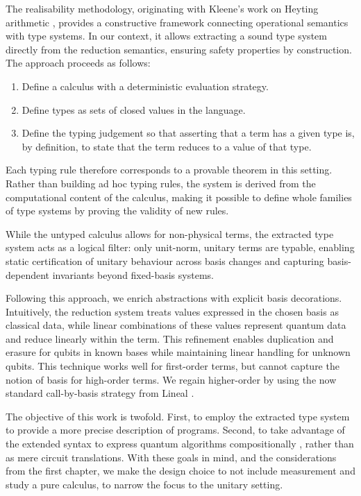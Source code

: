 The realisability methodology, originating with Kleene's work on Heyting
arithmetic \cite{KleeneJSL45}, provides a constructive framework connecting
operational semantics with type systems. In our context, it allows extracting 
a sound type system directly from the reduction semantics, ensuring safety
properties by construction. The approach proceeds as follows:
\begin{enumerate}
  \item Define a calculus with a deterministic evaluation strategy.
  \item Define types as sets of closed values in the language.
  \item Define the typing judgement so that asserting that a term has a given
  type is, by definition, to state that the term reduces to a value of that
  type.
\end{enumerate}
Each typing rule therefore corresponds to a provable theorem in this setting.
Rather than building ad hoc typing rules, the system is derived from the
computational content of the calculus, making it possible to define whole
families of type systems by proving the validity of new rules.

While the untyped calculus allows for non-physical terms, the
extracted type system acts as a logical filter: only unit-norm, unitary terms
are typable, enabling static certification of unitary behaviour across basis
changes and capturing basis-dependent invariants beyond fixed-basis systems.

Following this approach, we enrich abstractions with explicit basis
decorations. Intuitively, the reduction system treats values expressed in the
chosen basis as classical data, while linear combinations of these values
represent quantum data and reduce linearly within the term. This refinement
enables duplication and erasure for qubits in known bases while maintaining
linear handling for unknown qubits. This technique works well for first-order
terms, but cannot capture the notion of basis for high-order terms. We
regain higher-order by using the now standard call-by-basis strategy from Lineal
\cite{ArrighiDowekLMCS17}.

The objective of this work is twofold. First, to employ the extracted type
system to provide a more precise description of programs. Second, to take
advantage of the extended syntax to express quantum algorithms compositionally ,
 rather than as mere circuit translations.
With these goals in mind, and the considerations from the first chapter,
we make the design choice to not include measurement and
study a pure calculus, to narrow the focus to the unitary setting.


